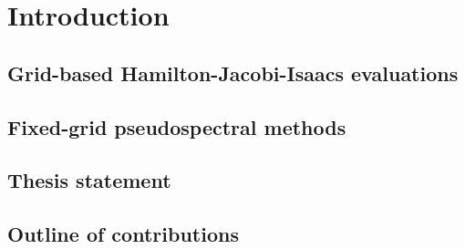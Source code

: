 
\section{Introduction}
\label{sec:intro}

\subsection{Grid-based Hamilton-Jacobi-Isaacs evaluations}
\label{sub:grid-based_hamilton_jacobi_isaacs_evaluations}

\subsection{Fixed-grid pseudospectral methods}
\label{sub:fixed-grid_pseudospectral_methods}

\subsection{Thesis statement}
\label{sub:thesis_statement}

\subsection{Outline of contributions}
\label{sub:outline_of_contributions}
